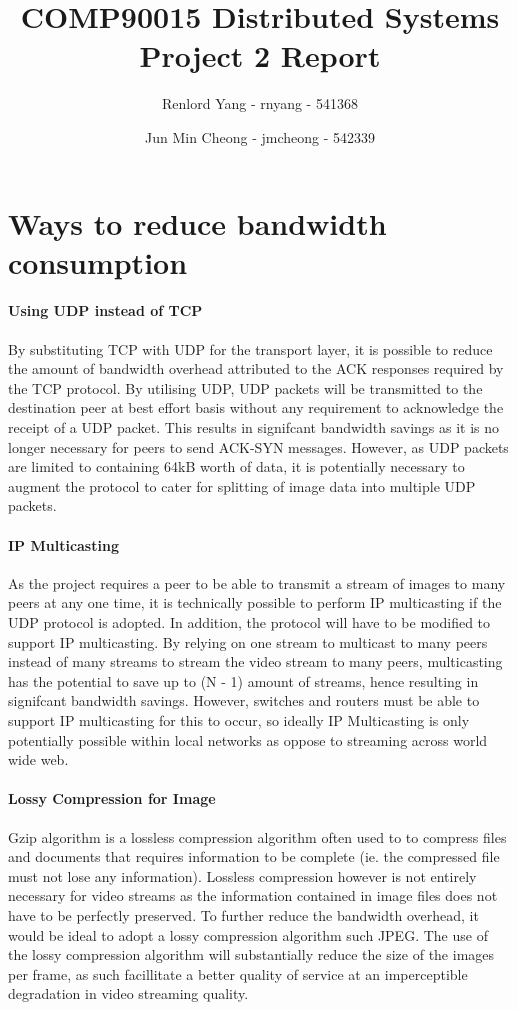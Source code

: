 \documentclass[10pt, twocolumn]{article}
\begin{document}
\title{COMP90015 Distributed Systems Project 2 Report}
\author{Renlord Yang - rnyang - 541368 \and Jun Min Cheong - jmcheong - 542339}
\date{}

\maketitle

\section{Ways to reduce bandwidth consumption}
\paragraph{Using UDP instead of TCP}
By substituting TCP with UDP for the transport layer, it is possible to reduce the amount of bandwidth overhead attributed to the ACK responses required by the TCP protocol. By utilising UDP, UDP packets will be transmitted to the destination peer at best effort basis without any requirement to acknowledge the receipt of a UDP packet. This results in signifcant bandwidth savings as it is no longer necessary for peers to send ACK-SYN messages. However, as UDP packets are limited to containing 64kB worth of data, it is potentially necessary to augment the protocol to cater for splitting of image data into multiple UDP packets. 

\paragraph{IP Multicasting}
As the project requires a peer to be able to transmit a stream of images to many peers at any one time, it is technically possible to perform IP multicasting if the UDP protocol is adopted. In addition, the protocol will have to be modified to support IP multicasting. By relying on one stream to multicast to many peers instead of many streams to stream the video stream to many peers, multicasting has the potential to save up to (N - 1) amount of streams, hence resulting in signifcant bandwidth savings. However, switches and routers must be able to support IP multicasting for this to occur, so ideally IP Multicasting is only potentially possible within local networks as oppose to streaming across world wide web. 

\paragraph{Lossy Compression for Image}
Gzip algorithm is a lossless compression algorithm often used to to compress files and documents that requires information to be complete (ie. the compressed file must not lose any information). Lossless compression however is not entirely necessary for video streams as the information contained in image files does not have to be perfectly preserved. To further reduce the bandwidth overhead, it would be ideal to adopt a lossy compression algorithm such JPEG. The use of the lossy compression algorithm will substantially reduce the size of the images per frame, as such facillitate a better quality of service at an imperceptible degradation in video streaming quality.
\end{document}
